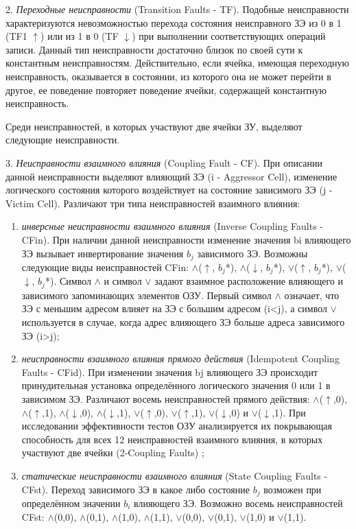 2. \textit{Переходные неисправности} (Transition Faults - TF). Подобные неисправности характеризуются невозможностью перехода состояния неисправного ЗЭ из 0 в 1 (TF1 $\uparrow$) или из 1 в 0 (TF $\downarrow$) при выполнении соответствующих операций записи. Данный тип неисправности достаточно близок по своей сути к константным неисправностям. Действительно, если ячейка, имеющая переходную неисправность, оказывается в состоянии, из которого она не может перейти в другое, ее поведение повторяет поведение ячейки, содержащей константную неисправность.

Среди неисправностей, в которых участвуют две ячейки ЗУ, выделяют следующие неисправности.

3. \textit{Неисправности взаимного влияния} (Coupling Fault - CF). При описании данной неисправности выделяют влияющий ЗЭ (i - Aggressor Cell), изменение логического состояния которого воздействует на состояние зависимого ЗЭ (j - Victim Cell). Различают три типа неисправностей взаимного влияния:
\begin{enumerate}
\item \textit{инверсные неисправности взаимного влияния} (Inverse Coupling Faults - CFin). При наличии данной неисправности изменение значения bi влияющего ЗЭ вызывает инвертирование значения $b_j$ зависимого ЗЭ. Возможны следующие виды неисправностей CFin: $\wedge$($\uparrow$, $b_j$*), $\wedge$($\downarrow$, $b_j$*), $\vee$($\uparrow$, $b_j$*), $\vee$($\downarrow$, $b_j$*). Символ $\wedge$ и символ $\vee$ задают взаимное расположение влияющего и зависимого запоминающих элементов ОЗУ. Первый символ $\wedge$ означает, что ЗЭ с меньшим адресом влияет на ЗЭ с большим адресом (i<j), а символ $\vee$ используется в случае, когда адрес влияющего ЗЭ больше адреса зависимого ЗЭ (i>j);
\item \textit{неисправности взаимного влияния прямого действия} (Idempotent Coupling Faults - CFid). При изменении значения bj влияющего ЗЭ происходит принудительная установка определённого логического значения 0 или 1 в зависимом ЗЭ. Различают восемь неисправностей прямого действия: $\wedge$($\uparrow$,0), $\wedge$($\uparrow$,1), $\wedge$($\downarrow$,0), $\wedge$($\downarrow$,1), $\vee$($\uparrow$,0), $\vee$($\uparrow$,1), $\vee$($\downarrow$,0) и $\vee$($\downarrow$,1). При исследовании эффективности тестов ОЗУ анализируется их покрывающая способность для всех 12 неисправностей взаимного влияния, в которых участвуют две ячейки (2-Coupling Faults) \cite{faults};
\item \textit{статические неисправности взаимного влияния} (State Coupling Faults -CFst). Переход зависимого ЗЭ в какое либо состояние $b_j$ возможен при определённом значении $b_i$ влияющего ЗЭ. Возможно восемь неисправностей CFst: $\wedge$(0,0), $\wedge$(0,1), $\wedge$(1,0), $\wedge$(1,1), $\vee$(0,0), $\vee$(0,1), $\vee$(1,0) и $\vee$(1,1).
\end{enumerate}

